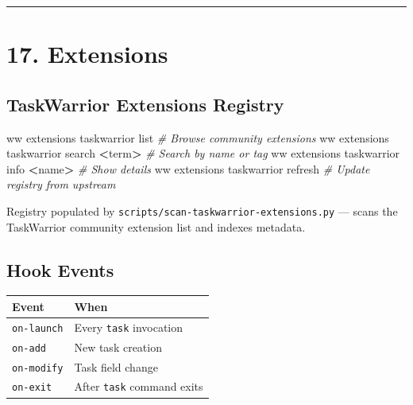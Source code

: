 \documentclass[
]{article}
\newenvironment{Shaded}{\begin{snugshade}}{\end{snugshade}}
\newcommand{\CommentTok}[1]{\textcolor[rgb]{0.56,0.35,0.01}{\textit{#1}}}
\newcommand{\ExtensionTok}[1]{#1}
\newcommand{\NormalTok}[1]{#1}
\newcommand{\OperatorTok}[1]{\textcolor[rgb]{0.81,0.36,0.00}{\textbf{#1}}}
\newcounter{none} %
\begin{document}
\begin{center}\rule{0.5\linewidth}{0.5pt}\end{center}

\section{17. Extensions}\label{extensions}

\subsection{TaskWarrior Extensions
Registry}\label{taskwarrior-extensions-registry}

\begin{Shaded}
\begin{Highlighting}[]
\ExtensionTok{ww}\NormalTok{ extensions taskwarrior list              }\CommentTok{\# Browse community extensions}
\ExtensionTok{ww}\NormalTok{ extensions taskwarrior search }\OperatorTok{\textless{}}\NormalTok{term}\OperatorTok{\textgreater{}}     \CommentTok{\# Search by name or tag}
\ExtensionTok{ww}\NormalTok{ extensions taskwarrior info }\OperatorTok{\textless{}}\NormalTok{name}\OperatorTok{\textgreater{}}       \CommentTok{\# Show details}
\ExtensionTok{ww}\NormalTok{ extensions taskwarrior refresh           }\CommentTok{\# Update registry from upstream}
\end{Highlighting}
\end{Shaded}

Registry populated by \texttt{scripts/scan-taskwarrior-extensions.py}
--- scans the TaskWarrior community extension list and indexes metadata.

\subsection{Hook Events}\label{hook-events}

{\def\LTcaptype{none} %
\begin{longtable}[]{@{}ll@{}}
\toprule\noalign{}
Event & When \\
\midrule\noalign{}
\endhead
\bottomrule\noalign{}
\endlastfoot
\texttt{on-launch} & Every \texttt{task} invocation \\
\texttt{on-add} & New task creation \\
\texttt{on-modify} & Task field change \\
\texttt{on-exit} & After \texttt{task} command exits \\
\end{longtable}
}
\end{document}
